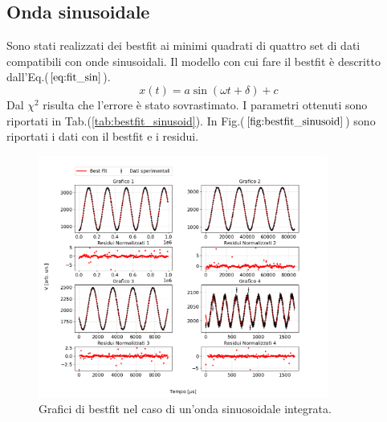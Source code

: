 \documentclass{article}
\begin{document}
    \subsection{Onda sinusoidale}
       Sono stati realizzati dei bestfit ai minimi quadrati
        di quattro set di dati compatibili con onde sinusoidali.
        Il modello con cui fare il bestfit è descritto dall'Eq.($\ref{eq:fit_sin}$).
            \begin{equation}
                x(t)=a \sin\left(\omega t+\delta\right)+c
                \label{eq:fit_sin}
            \end{equation} 
        Dal $\chi^2$ risulta che l'errore è stato sovrastimato. 
        I parametri ottenuti sono riportati in Tab.(\ref{tab:bestfit_sinusoid}).%
        In Fig.($\ref{fig:bestfit_sinusoid}$) sono riportati i dati con il bestfit e 
        i residui.

            \begin{figure}[H]            
                \centering
                \includegraphics[width=0.85\textwidth]{bestfit_sinusoid.png} %
                \caption{Grafici di bestfit nel caso di un'onda sinuosoidale integrata.
                }
                \label{fig:bestfit_sinusoid}

            \end{figure}    
\end{document}
